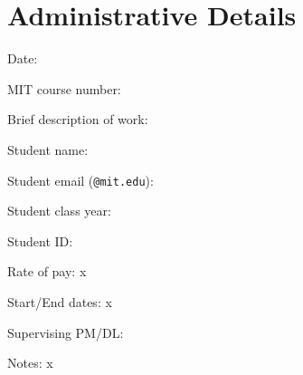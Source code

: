 \documentclass{article}
\begin{document}
\break
\section*{Administrative Details}

\begin{tcolorbox}[colback=black!0!white,colframe=black!75!black, boxrule = 0pt, frame hidden, sharpish corners]
\vspace{0.7cm}
Date: \makebox[12cm]{\hrulefill}

\vspace{0.7cm}
MIT course number: \makebox[9cm]{\hrulefill}

\vspace{0.7cm}
Brief description of work: \makebox[9cm]{\hrulefill}

\vspace{0.7cm}
Student name: \makebox[10cm]{\hrulefill}

\vspace{0.7cm}
Student email (\texttt{@mit.edu}): \makebox[8cm]{\hrulefill}

\vspace{0.7cm}
Student class year: \makebox[10cm]{\hrulefill}

\vspace{0.7cm}
Student ID: \makebox[11cm]{\hrulefill}

\vspace{0.7cm}
Rate of pay: {x}

\vspace{0.7cm}
Start/End dates: {x}

\vspace{0.7cm}
Supervising PM/DL: \makebox[9cm]{\hrulefill}

\vspace{0.7cm}
Notes: {x}
\vspace{2cm}
\end{tcolorbox}
\end{document}
